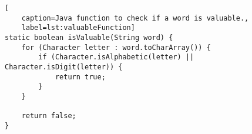 
\begin{lstlisting}[
	caption=Java function to check if a word is valuable.,
	label=lst:valuableFunction]	
static boolean isValuable(String word) {
	for (Character letter : word.toCharArray()) {
		if (Character.isAlphabetic(letter) || Character.isDigit(letter)) {
			return true;
		}
	}

	return false;
}
	
\end{lstlisting}